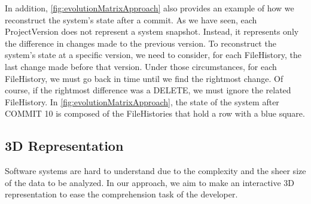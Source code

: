 In addition, \autoref{fig:evolutionMatrixApproach} also provides an example of how we reconstruct the system's state after a commit. 
As we have seen, each ProjectVersion does not represent a system snapshot.
Instead, it represents only the difference in changes made to the previous version. 
To reconstruct the system's state at a specific version, we need to consider, for each FileHistory, the last change made before that version. 
Under those circumstances, for each FileHistory, we must go back in time until we find the rightmost change. Of course, if the rightmost difference was a DELETE, we must ignore the related FileHistory.
In \autoref{fig:evolutionMatrixApproach}, the state of the system after COMMIT 10 is composed of the FileHistories that hold a row with a blue square. 



\subsection{3D Representation}
\label{s:3DRepr}

Software systems are hard to understand due to the complexity and the sheer size of the data to be analyzed.
In our approach, we aim to make an interactive 3D representation to ease the comprehension task of the developer. 
\bigbreak

